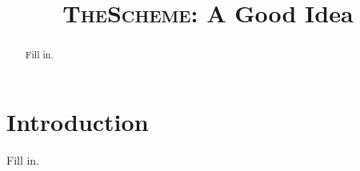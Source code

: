 \documentclass[preprint,10pt,numbers]{acg_sigplanconf_v32}
\newcommand{\Name}{\textsc{TheScheme}\xspace}
\begin{document}
\setlength{\pdfpageheight}{\paperheight}
\setlength{\pdfpagewidth}{\paperwidth}




\title{\Name: A Good Idea}

\authorinfo{}
           {}
           {}

\maketitle

\begin{abstract}
Fill in.
\end{abstract}



\section{Introduction}

Fill in.


\end{document}
